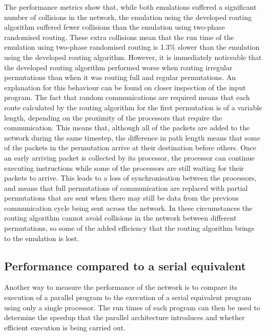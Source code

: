 \documentclass[a4paper, 12pt]{article}
\begin{document}
The performance metrics show that, while both emulations suffered a significant number of collisions in the network, the emulation using the developed routing algorithm suffered fewer collisions than the emulation using two-phase randomised routing. These extra collisions mean that the run time of the emulation using two-phase randomised routing is 1.3\% slower than the emulation using the developed routing algorithm. However, it is immediately noticeable that the developed routing algorithm performed worse when routing irregular permutations than when it was routing full and regular permutations. An explanation for this behaviour can be found on closer inspection of the input program. The fact that random communications are required means that each route calculated by the routing algorithm for the first permutation is of a variable length, depending on the proximity of the processors that require the communication. This means that, although all of the packets are added to the network during the same timestep, the difference in path length means that some of the packets in the permutation arrive at their destination before others. Once an early arriving packet is collected by its processor, the processor can continue executing instructions while some of the processors are still waiting for their packets to arrive. This leads to a loss of synchronisation between the processors, and means that full permutations of communication are replaced with partial permutations that are sent when there may still be data from the previous communication cycle being sent across the network. In these circumstances the routing algorithm cannot avoid collisions in the network between different permutations, so some of the added efficiency that the routing algorithm brings to the emulation is lost.

\subsection{Performance compared to a serial equivalent}

Another way to measure the performance of the network is to compare its execution of a parallel program to the execution of a serial equivalent program using only a single processor. The run times of each program can then be used to determine the speedup that the parallel architecture introduces and whether efficient execution is being carried out.
\end{document}
